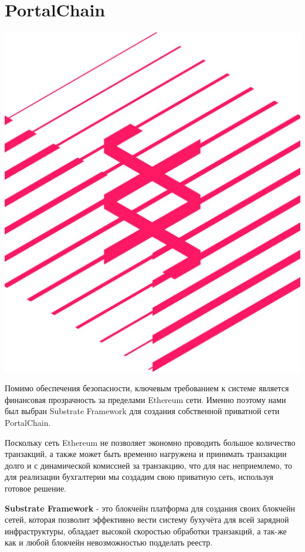 \documentclass[a4paper,12pt]{report}
\begin{document}
\chapter{PortalChain}

\vspace*{0.5cm}
\includegraphics[width=13.6cm]{substrate-logo}
\vspace*{0.5cm}


Помимо обеспечения безопасности, ключевым требованием к системе является финансовая прозрачность за пределами Ethereum сети.
Именно поэтому нами был выбран Substrate Framework для создания собственной приватной сети PortalChain.

Поскольку сеть Ethereum не позволяет экономно проводить большое количество транзакций, а также может быть временно нагружена и принимать транзакции долго и с динамической комиссией за транзакцию, что для нас неприемлемо, то для реализации бухгалтерии мы создадим свою приватную сеть, используя готовое решение.

\textbf{Substrate Framework} - это блокчейн платформа для создания своих блокчейн сетей, которая позволит эффективно вести систему бухучёта для всей зарядной инфраструктуры, обладает высокой скоростью обработки транзакций, а так-же как и любой блокчейн невозможностью подделать реестр.
\end{document}
